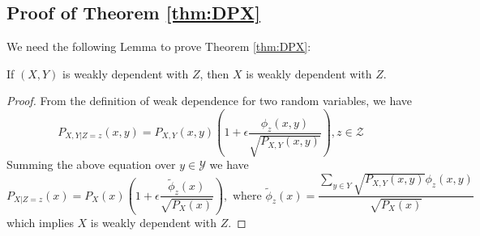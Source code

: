 \subsection{Proof of Theorem \ref{thm:DPX}}
We need the following Lemma to prove Theorem \ref{thm:DPX}:
\begin{lemma}\label{lem:xyz}
	If $(X,Y)$ is weakly dependent with $Z$, then $X$ is weakly dependent with $Z$.
\end{lemma}
\begin{proof}
	From the definition of weak dependence for two random variables, we have
	\begin{equation}
	P_{X,Y|Z=z}(x,y) = P_{X,Y}(x,y)(1+\epsilon \frac{\phi_z(x,y)}{\sqrt{P_{X,Y}(x,y)}}), z \in \mathcal{Z}
	\end{equation}
	Summing the above equation over $y\in \mathcal{Y}$ we have
	\begin{equation}
	P_{X|Z=z}(x) = P_X(x)(1+\epsilon\frac{\tilde{\phi}_z(x)}{\sqrt{P_X(x)}}),
	\textrm{ where } \tilde{\phi}_z(x) = \frac{\sum_{y\in Y} \sqrt{P_{X,Y}(x,y) }\phi_z(x,y)}{\sqrt{P_X(x)}}
	\end{equation}
	which implies $X$ is weakly dependent with $Z$.
\end{proof}
